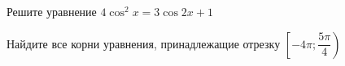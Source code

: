\begin{ex}
	\begin{condition}
		\begin{enumcols}[label=\asbuk*)]
			\item Решите уравнение \( 4\cos^2 x= 3\cos 2x +1 \)
			\item Найдите все корни уравнения, принадлежащие отрезку \( \left[-4\pi;\dfrac{5\pi}{4}\right) \)
		\end{enumcols}
	\end{condition}
\end{ex}